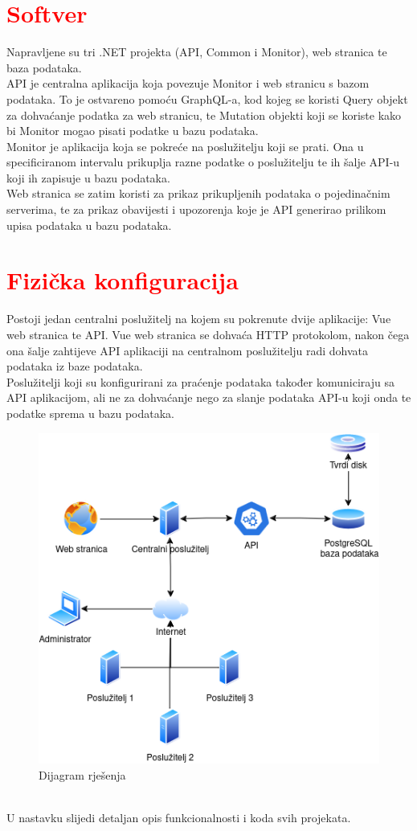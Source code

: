 \documentclass[zavrsnirad]{fer}
\begin{document}
\section{\textcolor{red}{Softver}}
Napravljene su tri .NET projekta (API, Common i Monitor), web stranica te baza podataka.
\\API je centralna aplikacija koja povezuje Monitor i web stranicu s bazom podataka. To je ostvareno pomoću GraphQL-a, kod kojeg se koristi Query objekt za dohvaćanje podatka za web stranicu, te Mutation objekti koji se koriste kako bi Monitor mogao pisati podatke u bazu podataka.
\\Monitor je aplikacija koja se pokreće na poslužitelju koji se prati. Ona u specificiranom intervalu prikuplja razne podatke o poslužitelju te ih šalje API-u koji ih zapisuje u bazu podataka.
\\Web stranica se zatim koristi za prikaz prikupljenih podataka o pojedinačnim serverima, te za prikaz obavijesti i upozorenja koje je API generirao prilikom upisa podataka u bazu podataka.

\section{\textcolor{red}{Fizička konfiguracija}}
Postoji jedan centralni poslužitelj na kojem su pokrenute dvije aplikacije: Vue web stranica te API. Vue web stranica se dohvaća HTTP protokolom, nakon čega ona šalje zahtijeve API aplikaciji na centralnom poslužitelju radi dohvata podataka iz baze podataka.
\\Poslužitelji koji su konfigurirani za praćenje podataka također komuniciraju sa API aplikacijom, ali ne za dohvaćanje nego za slanje podataka API-u koji onda te podatke sprema u bazu podataka.
\begin{figure}[htb!]
	\centering
	\includegraphics[width=0.6\linewidth]{images/flowchart.png} 
	\caption{Dijagram rješenja}
	\label{slk:flowchart}
\end{figure}
\\U nastavku slijedi detaljan opis funkcionalnosti i koda svih projekata.
\end{document}
